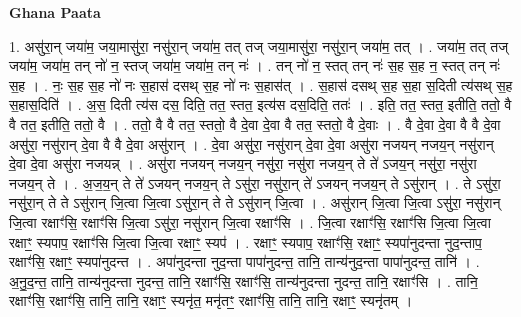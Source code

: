 \documentclass[17pt]{extarticle}
\begin{document}
\textbf{Ghana Paata } \newline

1. असु॑रा॒न् जया॑म॒ जया॒मासु॑रा॒ नसु॑रा॒न् जया॑म॒ तत् तज् जया॒मासु॑रा॒ नसु॑रा॒न् जया॑म॒ तत् । . जया॑म॒ तत् तज् जया॑म॒ जया॑म॒ तन् नो॑ न॒ स्तज् जया॑म॒ जया॑म॒ तन् नः॑ । . तन् नो॑ न॒ स्तत् तन् नः॑ स॒ह स॒ह न॒ स्तत् तन् नः॑ स॒ह । . नः॒ स॒ह स॒ह नो॑ नः स॒हास॑ दसथ् स॒ह नो॑ नः स॒हास॑त् । . स॒हास॑ दसथ् स॒ह स॒हा स॒दिती त्य॑सथ् स॒ह स॒हास॒दिति॑ । . अ॒स॒ दिती त्य॑स दस॒ दिति॒ तत॒ स्तत॒ इत्य॑स दस॒दिति॒ ततः॑ । . इति॒ तत॒ स्तत॒ इतीति॒ ततो॒ वै वै तत॒ इतीति॒ ततो॒ वै । . ततो॒ वै वै तत॒ स्ततो॒ वै दे॒वा दे॒वा वै तत॒ स्ततो॒ वै दे॒वाः । . वै दे॒वा दे॒वा वै वै दे॒वा असु॑रा॒ नसु॑रान् दे॒वा वै वै दे॒वा असु॑रान् । . दे॒वा असु॑रा॒ नसु॑रान् दे॒वा दे॒वा असु॑रा नजयन् नजय॒न् नसु॑रान् दे॒वा दे॒वा असु॑रा नजयन्न् । . असु॑रा नजयन् नजय॒न् नसु॑रा॒ नसु॑रा नजय॒न् ते ते॑ ऽजय॒न् नसु॑रा॒ नसु॑रा नजय॒न् ते । . अ॒ज॒य॒न् ते ते॑ ऽजयन् नजय॒न् ते ऽसु॑रा॒ नसु॑रा॒न् ते॑ ऽजयन् नजय॒न् ते ऽसु॑रान् । . ते ऽसु॑रा॒ नसु॑रा॒न् ते ते ऽसु॑रान् जि॒त्वा जि॒त्वा ऽसु॑रा॒न् ते ते ऽसु॑रान् जि॒त्वा । . असु॑रान् जि॒त्वा जि॒त्वा ऽसु॑रा॒ नसु॑रान् जि॒त्वा रक्षाꣳ॑सि॒ रक्षाꣳ॑सि जि॒त्वा ऽसु॑रा॒ नसु॑रान् जि॒त्वा रक्षाꣳ॑सि । . जि॒त्वा रक्षाꣳ॑सि॒ रक्षाꣳ॑सि जि॒त्वा जि॒त्वा रक्षाꣳ॒॒ स्यपाप॒ रक्षाꣳ॑सि जि॒त्वा जि॒त्वा रक्षाꣳ॒॒ स्यप॑ । . रक्षाꣳ॒॒ स्यपाप॒ रक्षाꣳ॑सि॒ रक्षाꣳ॒॒ स्यपा॑नुदन्ता नुद॒न्ताप॒ रक्षाꣳ॑सि॒ रक्षाꣳ॒॒ स्यपा॑नुदन्त । . अपा॑नुदन्ता नुद॒न्ता पापा॑नुदन्त॒ तानि॒ तान्य॑नुद॒न्ता पापा॑नुदन्त॒ तानि॑ । . अ॒नु॒द॒न्त॒ तानि॒ तान्य॑नुदन्ता नुदन्त॒ तानि॒ रक्षाꣳ॑सि॒ रक्षाꣳ॑सि॒ तान्य॑नुदन्ता नुदन्त॒ तानि॒ रक्षाꣳ॑सि । . तानि॒ रक्षाꣳ॑सि॒ रक्षाꣳ॑सि॒ तानि॒ तानि॒ रक्षाꣳ॒॒ स्यनृ॑त॒ मनृ॑तꣳ॒॒ रक्षाꣳ॑सि॒ तानि॒ तानि॒ 
रक्षाꣳ॒॒ स्यनृ॑तम् । \newline
\end{document}
